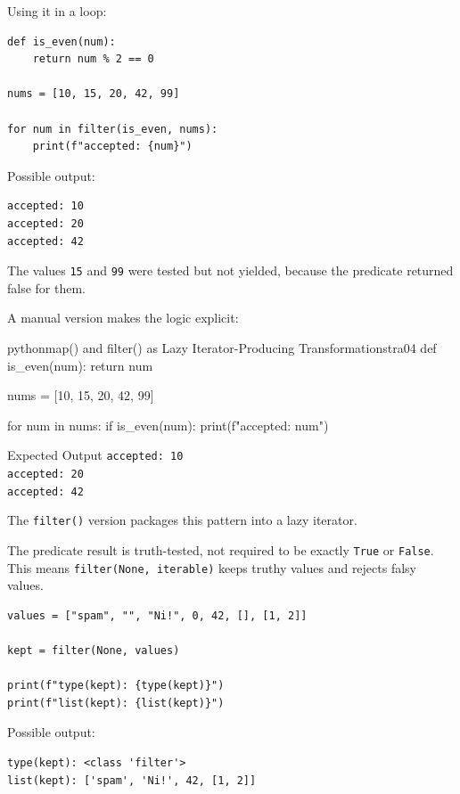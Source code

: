 \documentclass[a4paper,twoside]{report}
\begin{document}
Using it in a loop:

\begin{verbatim}
def is_even(num):
    return num % 2 == 0

nums = [10, 15, 20, 42, 99]

for num in filter(is_even, nums):
    print(f"accepted: {num}")
\end{verbatim}

Possible output:

\begin{verbatim}
accepted: 10
accepted: 20
accepted: 42
\end{verbatim}

The values \texttt{15} and \texttt{99} were tested but not yielded, because the predicate returned false for them.

A manual version makes the logic explicit:

\begin{codebox}[]{python}{map() and filter() as Lazy Iterator-Producing Transformations}{tra04}
def is_even(num):
    return num %

nums = [10, 15, 20, 42, 99]

for num in nums:
    if is_even(num):
        print(f"accepted: {num}")
\end{codebox}


\begin{iobox}{Expected Output}
\texttt{accepted: 10} \\
\texttt{accepted: 20} \\
\texttt{accepted: 42} \\
\end{iobox}




The \texttt{filter()} version packages this pattern into a lazy iterator.

The predicate result is truth-tested, not required to be exactly \texttt{True} or \texttt{False}. This means \texttt{filter(None, iterable)} keeps truthy values and rejects falsy values.

\begin{verbatim}
values = ["spam", "", "Ni!", 0, 42, [], [1, 2]]

kept = filter(None, values)

print(f"type(kept): {type(kept)}")
print(f"list(kept): {list(kept)}")
\end{verbatim}

Possible output:

\begin{verbatim}
type(kept): <class 'filter'>
list(kept): ['spam', 'Ni!', 42, [1, 2]]
\end{verbatim}
\end{document}
